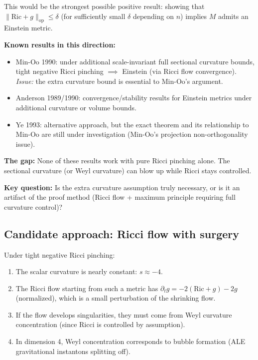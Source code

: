 This would be the strongest possible positive result: showing that
$\|\mathrm{Ric} + g\|_{\mathrm{op}} \leq \delta$ (for sufficiently small $\delta$ depending on $n$)
implies $M$ admits an Einstein metric.

\textbf{Known results in this direction:}
\begin{itemize}
\item Min-Oo 1990: under additional scale-invariant full sectional curvature bounds, 
      tight negative Ricci pinching $\implies$ Einstein (via Ricci flow convergence).
      \textit{Issue:} the extra curvature bound is essential to Min-Oo's argument.
\item Anderson 1989/1990: convergence/stability results for Einstein metrics under
      additional curvature or volume bounds.
\item Ye 1993: alternative approach, but the exact theorem and its relationship to Min-Oo
      are still under investigation (Min-Oo's projection non-orthogonality issue).
\end{itemize}

\textbf{The gap:} None of these results work with pure Ricci pinching alone.
The sectional curvature (or Weyl curvature) can blow up while Ricci stays controlled.

\textbf{Key question:} Is the extra curvature assumption truly necessary, or is it an
artifact of the proof method (Ricci flow + maximum principle requiring full curvature control)?

\subsection{Candidate approach: Ricci flow with surgery}

Under tight negative Ricci pinching:
\begin{enumerate}
\item The scalar curvature is nearly constant: $s \approx -4$.
\item The Ricci flow starting from such a metric has $\partial_t g = -2(\mathrm{Ric} + g) - 2g$
      (normalized), which is a small perturbation of the shrinking flow.
\item If the flow develops singularities, they must come from Weyl curvature concentration
      (since Ricci is controlled by assumption).
\item In dimension 4, Weyl concentration corresponds to bubble formation (ALE gravitational
      instantons splitting off).
\end{enumerate}

